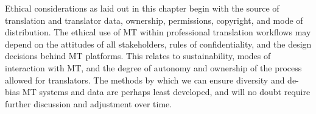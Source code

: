 \documentclass[output=paper]{langscibook}
\begin{document}
Ethical considerations as laid out in this chapter begin with the source of translation and translator data, ownership, permissions, copyright, and mode of distribution. The ethical use of MT within professional translation workflows may depend on the attitudes of all stakeholders, rules of confidentiality, and the design decisions behind MT platforms. This relates to sustainability, modes of interaction with MT, and the degree of autonomy and ownership of the process allowed for translators. The methods by which we can ensure diversity and de-bias MT systems and data are perhaps least developed, and will no doubt require further discussion and adjustment over time.\largerpage

\printbibliography[heading=subbibliography,notkeyword=this]
\end{document}
